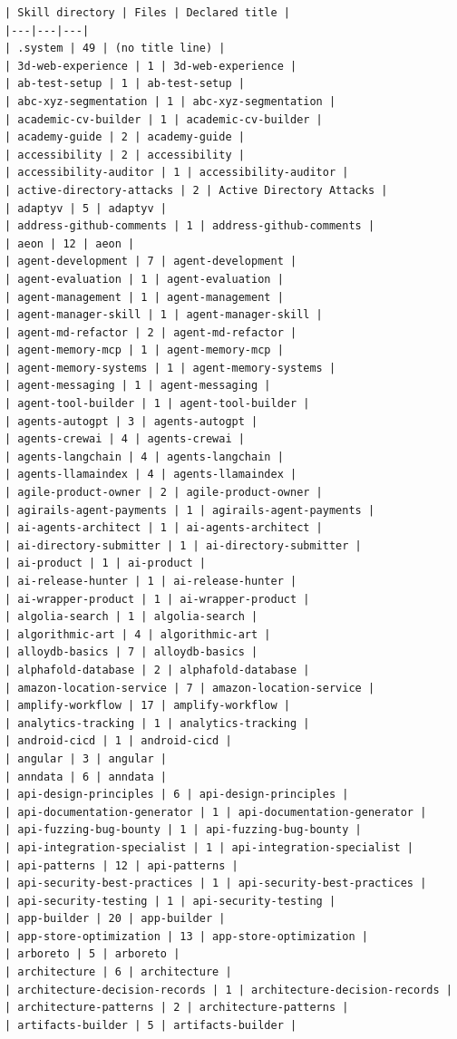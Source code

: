 \begin{Verbatim}[breaklines,breakanywhere,fontsize=\footnotesize]
| Skill directory | Files | Declared title |
|---|---|---|
| .system | 49 | (no title line) |
| 3d-web-experience | 1 | 3d-web-experience |
| ab-test-setup | 1 | ab-test-setup |
| abc-xyz-segmentation | 1 | abc-xyz-segmentation |
| academic-cv-builder | 1 | academic-cv-builder |
| academy-guide | 2 | academy-guide |
| accessibility | 2 | accessibility |
| accessibility-auditor | 1 | accessibility-auditor |
| active-directory-attacks | 2 | Active Directory Attacks |
| adaptyv | 5 | adaptyv |
| address-github-comments | 1 | address-github-comments |
| aeon | 12 | aeon |
| agent-development | 7 | agent-development |
| agent-evaluation | 1 | agent-evaluation |
| agent-management | 1 | agent-management |
| agent-manager-skill | 1 | agent-manager-skill |
| agent-md-refactor | 2 | agent-md-refactor |
| agent-memory-mcp | 1 | agent-memory-mcp |
| agent-memory-systems | 1 | agent-memory-systems |
| agent-messaging | 1 | agent-messaging |
| agent-tool-builder | 1 | agent-tool-builder |
| agents-autogpt | 3 | agents-autogpt |
| agents-crewai | 4 | agents-crewai |
| agents-langchain | 4 | agents-langchain |
| agents-llamaindex | 4 | agents-llamaindex |
| agile-product-owner | 2 | agile-product-owner |
| agirails-agent-payments | 1 | agirails-agent-payments |
| ai-agents-architect | 1 | ai-agents-architect |
| ai-directory-submitter | 1 | ai-directory-submitter |
| ai-product | 1 | ai-product |
| ai-release-hunter | 1 | ai-release-hunter |
| ai-wrapper-product | 1 | ai-wrapper-product |
| algolia-search | 1 | algolia-search |
| algorithmic-art | 4 | algorithmic-art |
| alloydb-basics | 7 | alloydb-basics |
| alphafold-database | 2 | alphafold-database |
| amazon-location-service | 7 | amazon-location-service |
| amplify-workflow | 17 | amplify-workflow |
| analytics-tracking | 1 | analytics-tracking |
| android-cicd | 1 | android-cicd |
| angular | 3 | angular |
| anndata | 6 | anndata |
| api-design-principles | 6 | api-design-principles |
| api-documentation-generator | 1 | api-documentation-generator |
| api-fuzzing-bug-bounty | 1 | api-fuzzing-bug-bounty |
| api-integration-specialist | 1 | api-integration-specialist |
| api-patterns | 12 | api-patterns |
| api-security-best-practices | 1 | api-security-best-practices |
| api-security-testing | 1 | api-security-testing |
| app-builder | 20 | app-builder |
| app-store-optimization | 13 | app-store-optimization |
| arboreto | 5 | arboreto |
| architecture | 6 | architecture |
| architecture-decision-records | 1 | architecture-decision-records |
| architecture-patterns | 2 | architecture-patterns |
| artifacts-builder | 5 | artifacts-builder |

\end{Verbatim}
